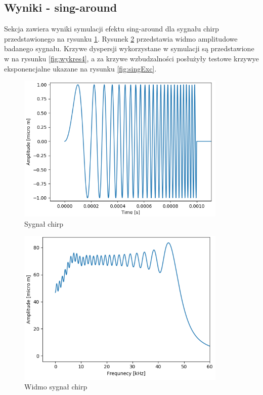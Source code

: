 \subsection{Wyniki - sing-around}
\label{sec:53f}

Sekcja zawiera wyniki symulacji efektu sing-around dla sygnału chirp przedstawionego na rysunku \ref{fig:chirp}. Rysunek \ref{fig:fchirp} przedstawia widmo amplitudowe badanego sygnału. Krzywe dyspersji wykorzystane w symulacji są przedstawione w na rysunku \ref{fig:wykres4}, a za krzywe wzbudzalności posłużyły testowe krzywye eksponencjalne ukazane na rysunku \ref{fig:singExc}.

\begin{figure}[h]
\centering
\includegraphics[width=10cm]{Zdjecia/5/chirp1}
\caption{Sygnał chirp}
\label{fig:chirp}
\end{figure}

\begin{figure}[h]
\centering
\includegraphics[width=10cm]{Zdjecia/5/chirp_widmo}
\caption{Widmo sygnał chirp}
\label{fig:fchirp}
\end{figure}

